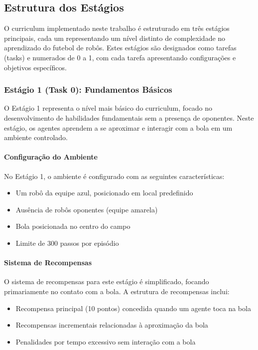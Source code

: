 \subsection{Estrutura dos Estágios}

O curriculum implementado neste trabalho é estruturado em três estágios principais, cada um representando um nível distinto de complexidade no aprendizado do futebol de robôs. Estes estágios são designados como tarefas (tasks) e numerados de 0 a 1, com cada tarefa apresentando configurações e objetivos específicos.

\subsubsection{Estágio 1 (Task 0): Fundamentos Básicos}
\label{subsubsec:estagio1}

O Estágio 1 representa o nível mais básico do curriculum, focado no desenvolvimento de habilidades fundamentais sem a presença de oponentes. Neste estágio, os agentes aprendem a se aproximar e interagir com a bola em um ambiente controlado.

\paragraph{Configuração do Ambiente}

No Estágio 1, o ambiente é configurado com as seguintes características:
\begin{itemize}
    \item Um robô da equipe azul, posicionado em local predefinido
    \item Ausência de robôs oponentes (equipe amarela)
    \item Bola posicionada no centro do campo
    \item Limite de 300 passos por episódio
\end{itemize}

\paragraph{Sistema de Recompensas}

O sistema de recompensas para este estágio é simplificado, focando primariamente no contato com a bola. A estrutura de recompensas inclui:
\begin{itemize}
    \item Recompensa principal (10 pontos) concedida quando um agente toca na bola
    \item Recompensas incrementais relacionadas à aproximação da bola
    \item Penalidades por tempo excessivo sem interação com a bola
\end{itemize}

